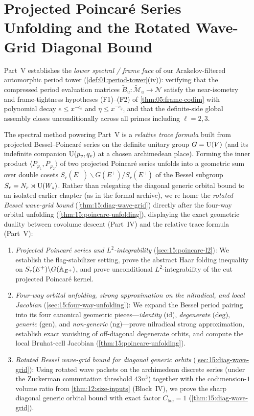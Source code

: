 \chapter{Projected Poincar\'e Series Unfolding and the Rotated Wave-Grid Diagonal Bound}
\label{ch:15}

Part~V establishes the \emph{lower spectral / frame face} of our Arakelov-filtered automorphic period tower (\cref{def:01:period-tower}(iv)): verifying that the compressed period evaluation matrices $\widetilde{B}_u : \widetilde{\mathcal{M}}_u \to \mathcal{N}$ satisfy the near-isometry and frame-tightness hypotheses (F1)--(F2) of \cref{thm:05:frame-codim} with polynomial decay $e \le x^{-c_e}$ and $\eta \le x^{-c_\eta}$, and that the definite-side global assembly closes unconditionally across all primes including $\ell = 2, 3$.

The spectral method powering Part~V is a \emph{relative trace formula} built from projected Bessel--Poincar\'e series on the definite unitary group $G = \mathrm{U}(V)$ (and its indefinite companion $\mathrm{U}(p_v, q_v)$ at a chosen archimedean place). Forming the inner product $\langle P_{\varphi_1}, P_{\varphi_2} \rangle$ of two projected Poincar\'e series unfolds into a geometric sum over double cosets $S_r(E^+) \backslash G(E^+) / S_r(E^+)$ of the Bessel subgroup $S_r = N_r \rtimes \mathrm{U}(W_z)$. Rather than relegating the diagonal generic orbital bound to an isolated earlier chapter (as in the formal archive), we re-home the \emph{rotated Bessel wave-grid bound} (\cref{thm:15:diag-wave-grid}) directly after the four-way orbital unfolding (\cref{thm:15:poincare-unfolding}), displaying the exact geometric duality between covolume descent (Part~IV) and the relative trace formula (Part~V):
\begin{enumerate}[label=(\roman*)]
\item \emph{Projected Poincar\'e series and $L^2$-integrability} (\cref{sec:15:poincare-l2}): We establish the flag-stabilizer setting, prove the abstract Haar folding inequality on $S_r(E^+) \backslash G(\mathbb{A}_{E^+})$, and prove unconditional $L^2$-integrability of the cut projected Poincar\'e kernel.
\item \emph{Four-way orbital unfolding, strong approximation on the nilradical, and local Jacobian} (\cref{sec:15:four-way-unfolding}): We expand the Bessel period pairing into its four canonical geometric pieces—\emph{identity} ($\mathrm{id}$), \emph{degenerate} ($\mathrm{deg}$), \emph{generic} ($\mathrm{gen}$), and \emph{non-generic} ($\mathrm{ng}$)—prove nilradical strong approximation, establish exact vanishing of off-diagonal degenerate orbits, and compute the local Bruhat-cell Jacobian (\cref{thm:15:poincare-unfolding}).
\item \emph{Rotated Bessel wave-grid bound for diagonal generic orbits} (\cref{sec:15:diag-wave-grid}): Using rotated wave packets on the archimedean discrete series (under the Zuckerman commutation threshold $43 n^3$) together with the codimension-$1$ volume ratio from \cref{thm:12:size-inputs} (Block~IV), we prove the sharp diagonal generic orbital bound with exact factor $C_{\mathrm{fac}} = 1$ (\cref{thm:15:diag-wave-grid}).
\end{enumerate}

